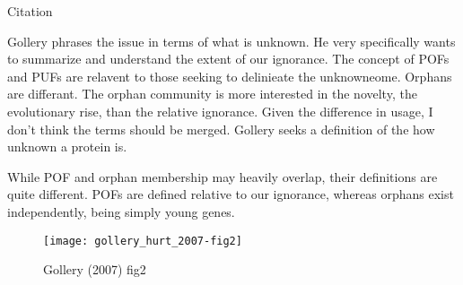     Citation \cite{gollery_pofs:_2007}

    Gollery phrases the issue in terms of what is unknown. He very
    specifically wants to summarize and understand the extent of our
    ignorance. The concept of POFs and PUFs are relavent to those seeking
    to delinieate the unknowneome. Orphans are differant. The orphan
    community is more interested in the novelty, the evolutionary rise,
    than the relative ignorance. Given the difference in usage, I don't
    think the terms should be merged. Gollery seeks a definition of the how
    unknown a protein is.

    While POF and orphan membership may heavily overlap, their definitions
    are quite different. POFs are defined relative to our ignorance,
    whereas orphans exist independently, being simply young genes.

    \begin{figure}[!hbpt] \centering
        \texttt{[image: gollery\_hurt\_2007-fig2]}
        \caption{Gollery (2007) fig2} \end{figure} \FloatBarrier

